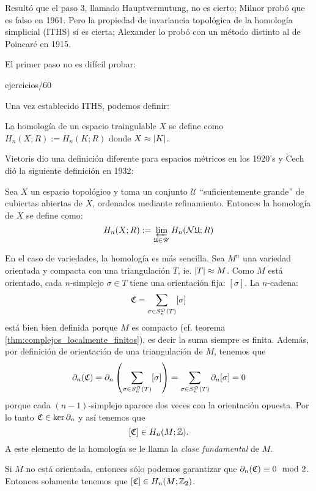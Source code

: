 \documentclass[../../topologia_algebraica]{subfiles}
\begin{document}
Result\'o que el paso 3, llamado Hauptvermutung, no es cierto; Milnor prob\'o que es falso en 1961. Pero la propiedad
de invariancia topol\'ogica de la homolog\'ia simplicial (ITHS) s\'i es cierta; Alexander lo prob\'o con un m\'etodo distinto al de
Poincar\'e en 1915.

El primer paso no es dif\'icil probar:

{ejercicios/60} %

Una vez establecido ITHS, podemos definir:

\begin{defin}
	La homolog\'ia de un espacio traingulable $X$ se define como $H_n(X;R):=H_n(K;R)$ donde $X\approx\left| K \right|$.
\end{defin}

Vietoris dio una definici\'on diferente para espacios m\'etricos en los 1920's y $\check{\text{C}}$ech di\'o la siguiente definici\'on
en 1932:

\begin{defin}
	Sea $X$ un espacio topol\'ogico y toma un conjunto $\mathscr{U}$ ``suficientemente grande'' de cubiertas abiertas de $X$,
	ordenados mediante refinamiento. Entonces la homolog\'ia de $X$ se define como:
	\[
		H_n(X;R):=\varprojlim_{\mathfrak{U}\in\mathscr{U}} H_n(\mathcal{N}\mathfrak{U};R)
	\]
\end{defin}

En el caso de variedades, la homolog\'ia es m\'as sencilla. Sea $M^n$ una variedad orientada y compacta con una
triangulaci\'on $T$, ie. $\left| T \right|\approx M$. Como $M$ est\'a orientado, cada $n$-simplejo $\sigma\in T$ tiene una
orientaci\'on fija: $[\sigma]$. La $n$-cadena:
\[
	\mathfrak{C}=\sum_{\sigma\in S_n^{\mathfrak{O}}(T)}[\sigma]
\]
est\'a bien bien definida porque $M$ es compacto (cf. teorema \ref{thm:complejos_localmente_finitos}), es decir la
suma siempre es finita. Adem\'as, por definici\'on de orientaci\'on de una triangulaci\'on de $M$, tenemos que
\[
	\partial_n(\mathfrak{C})=\partial_n\left( \sum_{\sigma\in S_n^{\mathfrak{O}}(T)}[\sigma] \right)=\sum_{\sigma\in S_n^{\mathfrak{O}}(T)}\partial_n[\sigma]=0
\]
porque cada $(n-1)$-simplejo aparece dos veces con la orientaci\'on opuesta. Por lo tanto $\mathfrak{C}\in\ker\partial_n$ y
as\'i tenemos que
\[
	[\mathfrak{C}]\in H_n(M;\mathbb{Z}).
\]
A este elemento de la homolog\'ia se le llama la \emph{clase fundamental} de $M$.

Si $M$ no est\'a orientada, entonces s\'olo podemos garantizar que $\partial_n(\mathfrak{C})\equiv 0\mod 2$. Entonces
solamente tenemos que $[\mathfrak{C}]\in H_n(M;\mathbb{Z}_2)$.
\end{document}
